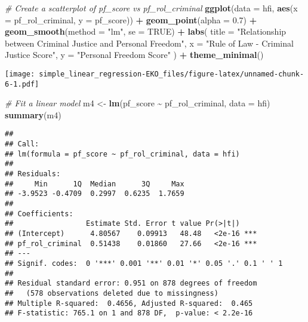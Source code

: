 \documentclass[
]{article}
\newenvironment{Shaded}{\begin{snugshade}}{\end{snugshade}}
\newcommand{\AttributeTok}[1]{\textcolor[rgb]{0.13,0.29,0.53}{#1}}
\newcommand{\CommentTok}[1]{\textcolor[rgb]{0.56,0.35,0.01}{\textit{#1}}}
\newcommand{\ConstantTok}[1]{\textcolor[rgb]{0.56,0.35,0.01}{#1}}
\newcommand{\FloatTok}[1]{\textcolor[rgb]{0.00,0.00,0.81}{#1}}
\newcommand{\FunctionTok}[1]{\textcolor[rgb]{0.13,0.29,0.53}{\textbf{#1}}}
\newcommand{\NormalTok}[1]{#1}
\newcommand{\OtherTok}[1]{\textcolor[rgb]{0.56,0.35,0.01}{#1}}
\newcommand{\SpecialCharTok}[1]{\textcolor[rgb]{0.81,0.36,0.00}{\textbf{#1}}}
\newcommand{\StringTok}[1]{\textcolor[rgb]{0.31,0.60,0.02}{#1}}
\begin{document}
\begin{Shaded}
\begin{Highlighting}[]
\CommentTok{\# Create a scatterplot of pf\_score vs pf\_rol\_criminal}
\FunctionTok{ggplot}\NormalTok{(}\AttributeTok{data =}\NormalTok{ hfi, }\FunctionTok{aes}\NormalTok{(}\AttributeTok{x =}\NormalTok{ pf\_rol\_criminal, }\AttributeTok{y =}\NormalTok{ pf\_score)) }\SpecialCharTok{+}
  \FunctionTok{geom\_point}\NormalTok{(}\AttributeTok{alpha =} \FloatTok{0.7}\NormalTok{) }\SpecialCharTok{+}
  \FunctionTok{geom\_smooth}\NormalTok{(}\AttributeTok{method =} \StringTok{"lm"}\NormalTok{, }\AttributeTok{se =} \ConstantTok{TRUE}\NormalTok{) }\SpecialCharTok{+}
  \FunctionTok{labs}\NormalTok{(}
    \AttributeTok{title =} \StringTok{"Relationship between Criminal Justice and Personal Freedom"}\NormalTok{,}
    \AttributeTok{x =} \StringTok{"Rule of Law {-} Criminal Justice Score"}\NormalTok{,}
    \AttributeTok{y =} \StringTok{"Personal Freedom Score"}
\NormalTok{  ) }\SpecialCharTok{+}
  \FunctionTok{theme\_minimal}\NormalTok{()}
\end{Highlighting}
\end{Shaded}

\texttt{[image: simple\_linear\_regression-EKO\_files/figure-latex/unnamed-chunk-6-1.pdf]}

\begin{Shaded}
\begin{Highlighting}[]
\CommentTok{\# Fit a linear model}
\NormalTok{m4 }\OtherTok{\textless{}{-}} \FunctionTok{lm}\NormalTok{(pf\_score }\SpecialCharTok{\textasciitilde{}}\NormalTok{ pf\_rol\_criminal, }\AttributeTok{data =}\NormalTok{ hfi)}
\FunctionTok{summary}\NormalTok{(m4)}
\end{Highlighting}
\end{Shaded}

\begin{verbatim}
## 
## Call:
## lm(formula = pf_score ~ pf_rol_criminal, data = hfi)
## 
## Residuals:
##     Min      1Q  Median      3Q     Max 
## -3.9523 -0.4709  0.2997  0.6235  1.7659 
## 
## Coefficients:
##                 Estimate Std. Error t value Pr(>|t|)    
## (Intercept)      4.80567    0.09913   48.48   <2e-16 ***
## pf_rol_criminal  0.51438    0.01860   27.66   <2e-16 ***
## ---
## Signif. codes:  0 '***' 0.001 '**' 0.01 '*' 0.05 '.' 0.1 ' ' 1
## 
## Residual standard error: 0.951 on 878 degrees of freedom
##   (578 observations deleted due to missingness)
## Multiple R-squared:  0.4656, Adjusted R-squared:  0.465 
## F-statistic: 765.1 on 1 and 878 DF,  p-value: < 2.2e-16
\end{verbatim}
\end{document}
